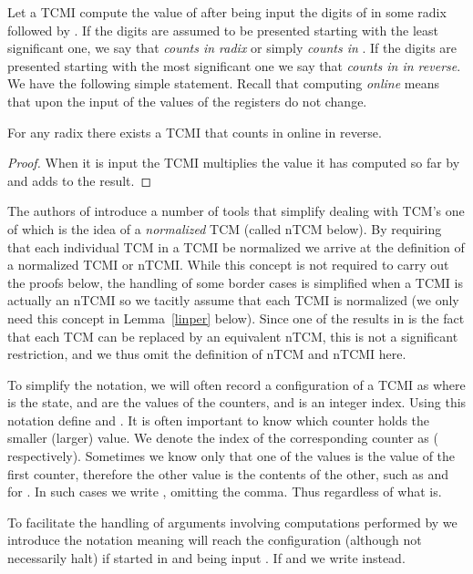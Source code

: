 \documentclass[12pt]{article}
\begin{document}
Let a TCMI  compute the value of  after being input the
digits of  in some radix  followed by . If the digits
are assumed to be presented starting with the least significant one,
we say that  {\it counts in radix \/} or simply {\it counts
  in \/}. If the digits are presented starting with the most
significant one we say that  {\it counts in  in reverse}.
We have the following simple statement. Recall that computing {\it
  online\/} means that upon the input of  the values of the
registers do not change.
\begin{proposition}\label{mosttoleast}
For any radix  there exists a TCMI that counts in  online
in reverse.
\end{proposition}
\begin{proof}
When it is input  the TCMI multiplies the value it has computed so
far by  and adds  to the result.
\end{proof}

The authors of \cite{ibarra} introduce a number of tools that simplify
dealing with TCM's one of which is the idea of a {\it normalized\/}
TCM (called nTCM below). By requiring that each individual TCM in a TCMI be
normalized we arrive at the definition of a normalized TCMI or
nTCMI. While this concept is not required to carry out the proofs
below, the handling of some border cases is simplified when a TCMI is
actually an nTCMI so we tacitly assume that each TCMI is normalized
(we only need this concept in Lemma~\ref{linper} below). Since one of
the results in \cite{ibarra} is the fact that each TCM can be replaced
by an equivalent nTCM, this is not a significant restriction, and we
thus omit the definition of nTCM  and nTCMI here.

To simplify the notation, we will often record a configuration of a
TCMI  as  where  is the state,  and 
are the values of the counters, and  is an integer index. Using this notation
define  and . It is
often important to know which counter holds the smaller (larger)
value. We denote the index of the corresponding
counter as 
( respectively). Sometimes we
know only that one of the values is the value of the first counter,
therefore the other value is the contents of the other, such as 
and  for . In such cases we write
, omitting the comma. Thus  regardless of what  is.

To facilitate the handling of arguments involving computations performed by
 we introduce the notation  meaning
 will reach the configuration (although not necessarily halt)  if started in
 and being input . If  and  we write
 instead.
 
\end{document}
